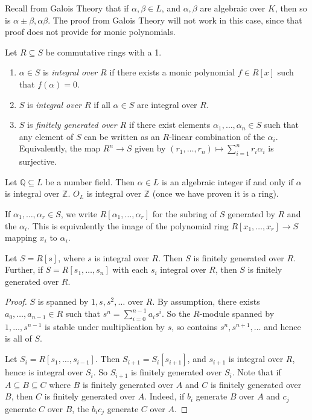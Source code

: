 Recall from Galois Theory that if \( \alpha, \beta \in L \), and \( \alpha, \beta \) are algebraic over \( K \), then so is \( \alpha \pm \beta, \alpha \beta \).
The proof from Galois Theory will not work in this case, since that proof does not provide for monic polynomials.
\begin{definition}
    Let \( R \subseteq S \) be commutative rings with a 1.
    \begin{enumerate}
        \item \( \alpha \in S \) is \emph{integral over \( R \)} if there exists a monic polynomial \( f \in R[x] \) such that \( f(\alpha) = 0 \).
        \item \( S \) is \emph{integral over \( R \)} if all \( \alpha \in S \) are integral over \( R \).
        \item \( S \) is \emph{finitely generated over \( R \)} if there exist elements \( \alpha_1, \dots, \alpha_n \in S \) such that any element of \( S \) can be written as an \( R \)-linear combination of the \( \alpha_i \).
        Equivalently, the map \( R^n \to S \) given by \( (r_1, \dots, r_n) \mapsto \sum_{i=1}^n r_i \alpha_i \) is surjective.
    \end{enumerate}
\end{definition}
\begin{example}
    Let \( \mathbb Q \subseteq L \) be a number field.
    Then \( \alpha \in L \) is an algebraic integer if and only if \( \alpha \) is integral over \( \mathbb Z \).
    \( O_L \) is integral over \( \mathbb Z \) (once we have proven it is a ring).
\end{example}
If \( \alpha_1, \dots, \alpha_r \in S \), we write \( R[\alpha_1, \dots, \alpha_r] \) for the subring of \( S \) generated by \( R \) and the \( \alpha_i \).
This is equivalently the image of the polynomial ring \( R[x_1, \dots, x_r] \to S \) mapping \( x_i \) to \( \alpha_i \).
\begin{proposition}
    Let \( S = R[s] \), where \( s \) is integral over \( R \).
    Then \( S \) is finitely generated over \( R \).
    Further, if \( S = R[s_1, \dots, s_n] \) with each \( s_i \) integral over \( R \), then \( S \) is finitely generated over \( R \).
\end{proposition}
\begin{proof}
    \( S \) is spanned by \( 1, s, s^2, \dots \) over \( R \).
    By assumption, there exists \( a_0, \dots, a_{n-1} \in R \) such that \( s^n = \sum_{i=0}^{n-1} a_i s^i \).
    So the \( R \)-module spanned by \( 1, \dots, s^{n-1} \) is stable under multiplication by \( s \), so contains \( s^n, s^{n+1}, \dots \) and hence is all of \( S \).

    Let \( S_i = R[s_1, \dots, s_{i-1}] \).
    Then \( S_{i+1} = S_i[s_{i+1}] \), and \( s_{i+1} \) is integral over \( R \), hence is integral over \( S_i \).
    So \( S_{i+1} \) is finitely generated over \( S_i \).
    Note that if \( A \subseteq B \subseteq C \) where \( B \) is finitely generated over \( A \) and \( C \) is finitely generated over \( B \), then \( C \) is finitely generated over \( A \).
    Indeed, if \( b_i \) generate \( B \) over \( A \) and \( c_j \) generate \( C \) over \( B \), the \( b_i c_j \) generate \( C \) over \( A \).
\end{proof}
